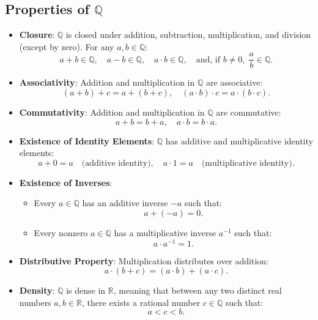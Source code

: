 \subsection{Properties of \( \mathbb{Q} \)}
\begin{itemize}
    \item \textbf{Closure}: \( \mathbb{Q} \) is closed under addition, subtraction, multiplication, and division (except by zero). For any \( a, b \in \mathbb{Q} \):
    \[
    a + b \in \mathbb{Q}, \quad a - b \in \mathbb{Q}, \quad a \cdot b \in \mathbb{Q}, \quad \text{and, if } b \neq 0, \; \frac{a}{b} \in \mathbb{Q}.
    \]

    \item \textbf{Associativity}: Addition and multiplication in \( \mathbb{Q} \) are associative:
    \[
    (a + b) + c = a + (b + c), \quad (a \cdot b) \cdot c = a \cdot (b \cdot c).
    \]

    \item \textbf{Commutativity}: Addition and multiplication in \( \mathbb{Q} \) are commutative:
    \[
    a + b = b + a, \quad a \cdot b = b \cdot a.
    \]

    \item \textbf{Existence of Identity Elements}: \( \mathbb{Q} \) has additive and multiplicative identity elements:
    \[
    a + 0 = a \quad \text{(additive identity)}, \quad a \cdot 1 = a \quad \text{(multiplicative identity)}.
    \]

    \item \textbf{Existence of Inverses}:
    \begin{itemize}
        \item Every \( a \in \mathbb{Q} \) has an additive inverse \( -a \) such that:
        \[
        a + (-a) = 0.
        \]
        \item Every nonzero \( a \in \mathbb{Q} \) has a multiplicative inverse \( a^{-1} \) such that:
        \[
        a \cdot a^{-1} = 1.
        \]
    \end{itemize}

    \item \textbf{Distributive Property}: Multiplication distributes over addition:
    \[
    a \cdot (b + c) = (a \cdot b) + (a \cdot c).
    \]

    \item \textbf{Density}: \( \mathbb{Q} \) is dense in \( \mathbb{R} \), meaning that between any two distinct real numbers \( a, b \in \mathbb{R} \), there exists a rational number \( c \in \mathbb{Q} \) such that:
    \[
    a < c < b.
    \]


\end{itemize}
